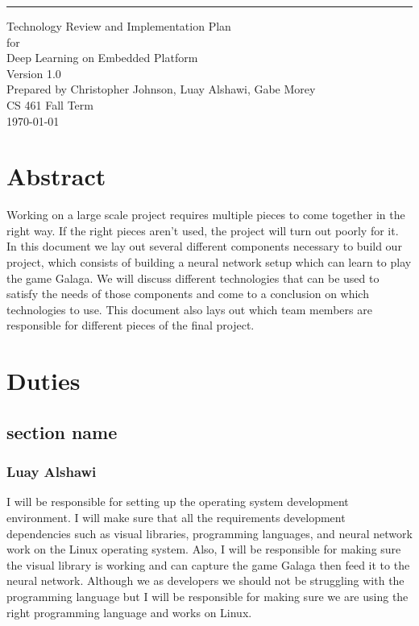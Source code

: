 \documentclass{scrreprt}
\date{}
\def\myversion{1.0}
\begin{document}
\begin{flushright}
    \rule{16cm}{5pt}\vskip1cm
    \begin{bfseries}
        \Huge{Technology Review and Implementation Plan}\\
        \vspace{1.9cm}
        for\\
        \vspace{1.9cm}
        Deep Learning on Embedded Platform\\
        \vspace{1.9cm}
        \LARGE{Version \myversion}\\
        \vspace{1.9cm}
        Prepared by Christopher Johnson, Luay Alshawi, Gabe Morey\\
        \vspace{1.9cm}
        CS 461 Fall Term\\
        \vspace{1.9cm}
        \today\\
    \end{bfseries}
\end{flushright}


\chapter{Abstract}
Working on a large scale project requires multiple pieces to come together in the right way. If the right pieces aren’t used,
the project will turn out poorly for it. In this document we lay out several different components necessary to build our project,
which consists of building a neural network setup which can learn to play the game Galaga.
We will discuss different technologies that can be used to satisfy the needs of those components and come to a conclusion on which technologies to use.
 This document also lays out which team members are responsible for different pieces of the final project.

\chapter{Duties}
\section{section name}

\subsection{Luay Alshawi}
I will be responsible for setting up the operating system development environment.
I will make sure that all the requirements development dependencies such as visual libraries, programming languages, and neural network work on the Linux operating system.
Also, I will be responsible for making sure the visual library is working and can capture the game Galaga then feed it to the neural network.
Although we as developers we should not be struggling with the programming language but I will be responsible for making sure we are using the right programming language and works on Linux.
\end{document}
